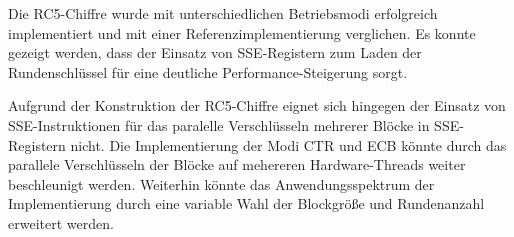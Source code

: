 \documentclass[course=erap]{aspdoc}
\begin{document}
Die RC5-Chiffre wurde mit unterschiedlichen Betriebsmodi erfolgreich implementiert und mit einer Referenzimplementierung verglichen. Es konnte gezeigt werden, dass der Einsatz von SSE-Registern zum Laden der Rundenschlüssel für eine deutliche Performance-Steigerung sorgt.\bigbreak

Aufgrund der Konstruktion der RC5-Chiffre eignet sich hingegen der Einsatz von SSE-Instruktionen für das paralelle Verschlüsseln mehrerer Blöcke in SSE-Registern nicht. Die Implementierung der Modi CTR und ECB könnte durch das parallele Verschlüsseln der Blöcke auf mehereren Hardware-Threads weiter beschleunigt werden. Weiterhin könnte das Anwendungsspektrum der Implementierung durch eine variable Wahl der Blockgröße und Rundenanzahl erweitert werden.

\printbibliography
\end{document}
